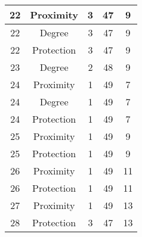\documentclass[results.tex]{subfiles}
\begin{document}
\begin{center}
\begin{tabular}{| c || c | c | c | c |}
            \hline
            22                      & Proximity                    & 3                      & 47                      & 9                    \\
            \hline
            22                      & Degree                       & 3                      & 47                      & 9                    \\
            \hline
            22                      & Protection                   & 3                      & 47                      & 9                    \\
            \hline
            23                      & Degree                       & 2                      & 48                      & 9                    \\
            \hline
            24                      & Proximity                    & 1                      & 49                      & 7                    \\
            \hline
            24                      & Degree                       & 1                      & 49                      & 7                    \\
            \hline
            24                      & Protection                   & 1                      & 49                      & 7                    \\
            \hline
            25                      & Proximity                    & 1                      & 49                      & 9                    \\
            \hline
            25                      & Protection                   & 1                      & 49                      & 9                    \\
            \hline
            26                      & Proximity                    & 1                      & 49                      & 11                   \\
            \hline
            26                      & Protection                   & 1                      & 49                      & 11                   \\
            \hline
            27                      & Proximity                    & 1                      & 49                      & 13                   \\
            \hline
            28                      & Protection                   & 3                      & 47                      & 13                   \\

\end{tabular}
\end{center}
\end{document}
